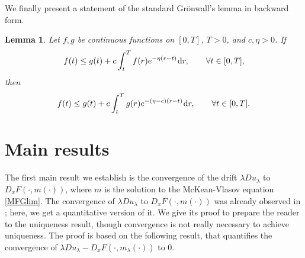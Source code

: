 \documentclass{amsart}
\newtheorem{lemma}[thm]{Lemma}
\theoremstyle{remark}
\theoremstyle{definition}
\theoremstyle{Claim}
\newcommand{\dd}{\hspace{0.7pt}{\rm d}}
\theoremstyle{plain}
\begin{document}
	We finally present a statement of the standard Gr\"onwall's lemma in backward form.
	
	\begin{lemma}\label{gro} Let $f, g$ be continuous functions on $[0,T]$, $T>0$, and $c, \eta > 0$. If
	\[
	f(t) \le g(t) + c \int_t^T f(r) e^{-\eta(r-t)} \dd r, \qquad \forall t \in [0,T],
	\]
	then
	\[
	f(t) \le g(t) + c \int_t^T g(r) e^{-(\eta-c)(r-t)} \dd r, \qquad \forall t \in [0,T].
	\]
	\end{lemma}

\section{Main results}

The first main result we establish is the convergence of the drift $\lambda Du_\lambda$ to $D_x F(\cdot,m(\cdot))$, where $m$ is the solution to the McKean-Vlasov equation \eqref{MFGlim}. The convergence of $\lambda Du_\lambda$ to $D_x F(\cdot,m(\cdot))$ was already observed in \cite{BC}; here, we get a quantitative version of it. We give its proof to prepare the reader to the uniqueness result, though convergence is not really necessary to achieve uniqueness. The proof is based on the following result, that quantifies the convergence of $\lambda Du_\lambda-D_x F(\cdot,m_\lambda(\cdot))$ to $0$.
\end{document}
